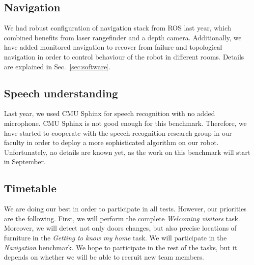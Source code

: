 \subsection{Navigation}

We had robust configuration of navigation stack from ROS last year, which combined benefits from laser rangefinder and a depth camera. 
Additionally, we have added monitored navigation to recover from failure and topological navigation in order to control behaviour of the robot in different rooms. Details are explained in Sec.~\ref{sec:software}.

\subsection{\label{sec:speechrec}Speech understanding}

Last year, we used CMU Sphinx for speech recognition with no added microphone. CMU Sphinx is not good enough for this benchmark. 
Therefore, we have started to cooperate with the speech recognition research group in our faculty in order to deploy a more sophisticated algorithm on our robot. 
Unfortunately, no details are known yet, as the work on this benchmark will start in September.

\subsection{Timetable}

We are doing our best in order to participate in all tests. However, our priorities are the following.
First, we will perform the complete \textit{Welcoming visitors} task. 
Moreover, we will detect not only doors changes, but also precise locations of furniture in the \textit{Getting to know my home} task. 
We will participate in the \textit{Navigation} benchmark. We hope to participate in the rest of the tasks, but it depends on whether we will be able to recruit new team members.


